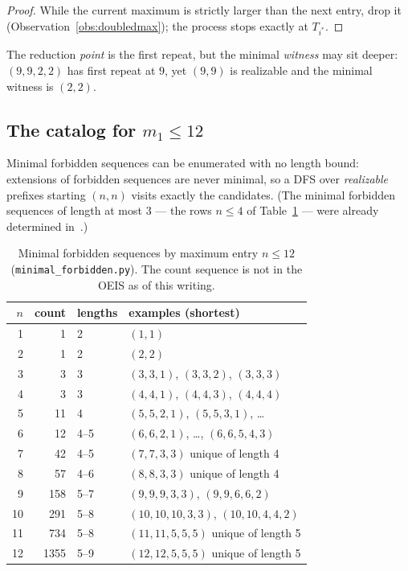 \documentclass[11pt]{article}
\theoremstyle{definition}
\theoremstyle{remark}
\begin{document}
\begin{proof}
While the current maximum is strictly larger than the next entry, drop it
(Observation~\ref{obs:doubledmax}); the process stops exactly at $T_{i^*}$.
\end{proof}

The reduction \emph{point} is the first repeat, but the minimal \emph{witness} may
sit deeper: $(9,9,2,2)$ has first repeat at $9$, yet $(9,9)$ is realizable and the
minimal witness is $(2,2)$.

\subsection{The catalog for $m_1\le12$}

Minimal forbidden sequences can be enumerated with no length bound: extensions of
forbidden sequences are never minimal, so a DFS over \emph{realizable} prefixes
starting $(n,n)$ visits exactly the candidates. (The minimal forbidden sequences of
length at most $3$ --- the rows $n\le4$ of Table~\ref{tab:catalog} --- were already
determined in~\cite[\S4.2.1]{Moragas10}.)

\begin{table}[ht]
\centering
\caption{Minimal forbidden sequences by maximum entry $n\le12$
(\texttt{minimal\_forbidden.py}). The count sequence is not in the OEIS as of this
writing.}
\label{tab:catalog}
\begin{tabular}{@{}rrll@{}}
\toprule
$n$ & count & lengths & examples (shortest) \\
\midrule
1 & 1 & 2 & $(1,1)$ \\
2 & 1 & 2 & $(2,2)$ \\
3 & 3 & 3 & $(3,3,1)$, $(3,3,2)$, $(3,3,3)$ \\
4 & 3 & 3 & $(4,4,1)$, $(4,4,3)$, $(4,4,4)$ \\
5 & 11 & 4 & $(5,5,2,1)$, $(5,5,3,1)$, \dots \\
6 & 12 & 4--5 & $(6,6,2,1)$, \dots, $(6,6,5,4,3)$ \\
7 & 42 & 4--5 & $(7,7,3,3)$ unique of length 4 \\
8 & 57 & 4--6 & $(8,8,3,3)$ unique of length 4 \\
9 & 158 & 5--7 & $(9,9,9,3,3)$, $(9,9,6,6,2)$ \\
10 & 291 & 5--8 & $(10,10,10,3,3)$, $(10,10,4,4,2)$ \\
11 & 734 & 5--8 & $(11,11,5,5,5)$ unique of length 5 \\
12 & 1355 & 5--9 & $(12,12,5,5,5)$ unique of length 5 \\
\bottomrule
\end{tabular}
\end{table}
\end{document}
